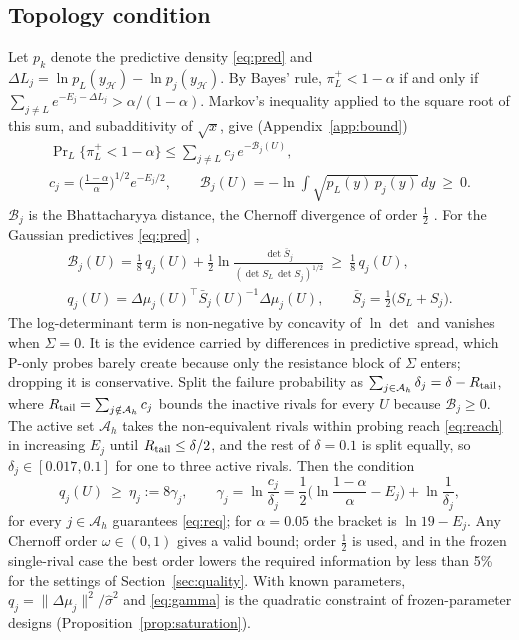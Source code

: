 \documentclass[journal,onecolumn,11pt]{IEEEtran}
\newcommand{\tp}{^{\top}}
\begin{document}
\subsection{Topology condition}
Let $p_k$ denote the predictive density \eqref{eq:pred} and $\Delta L_j=\ln p_L(y_{\mathcal H})-\ln p_j(y_{\mathcal H})$. By Bayes' rule, $\pi_L^+<1-\alpha$ if and only if $\sum_{j\ne L}e^{-E_j-\Delta L_j}>\alpha/(1-\alpha)$. Markov's inequality applied to the square root of this sum, and subadditivity of $\sqrt x$, give (Appendix~\ref{app:bound})
\begin{equation}\label{eq:union}
\begin{gathered}
\Pr\nolimits_L\{\pi_L^+<1-\alpha\}\le\sum_{j\ne L}c_j\,e^{-\mathcal B_j(U)},\\
c_j=\Big(\frac{1-\alpha}{\alpha}\Big)^{1/2}e^{-E_j/2},\qquad
\mathcal B_j(U)=-\ln\int\sqrt{p_L(y)\,p_j(y)}\,dy\ \ge\ 0 .
\end{gathered}
\end{equation}
$\mathcal B_j$ is the Bhattacharyya distance, the Chernoff divergence of order $\tfrac12$ \cite{chernoff1952}. For the Gaussian predictives \eqref{eq:pred} \cite{kailath1967},
\begin{equation}\label{eq:chernoff}
\begin{gathered}
\mathcal B_j(U)=\frac18\,q_j(U)+\frac12\ln\frac{\det\bar S_j}{(\det S_L\,\det S_j)^{1/2}}\ \ge\ \frac18\,q_j(U),\\
q_j(U)=\Delta\mu_j(U)\tp\bar S_j(U)^{-1}\Delta\mu_j(U),\qquad \bar S_j=\tfrac12\big(S_L+S_j\big).
\end{gathered}
\end{equation}
The log-determinant term is non-negative by concavity of $\ln\det$ and vanishes when $\Sigma=0$. It is the evidence carried by differences in predictive spread, which P-only probes barely create because only the resistance block of $\Sigma$ enters; dropping it is conservative. Split the failure probability as $\sum_{j\in\mathcal A_h}\delta_j=\delta-R_{\rm tail}$, where $R_{\rm tail}=\sum_{j\notin\mathcal A_h}c_j$ bounds the inactive rivals for every $U$ because $\mathcal B_j\ge0$. The active set $\mathcal A_h$ takes the non-equivalent rivals within probing reach \eqref{eq:reach} in increasing $E_j$ until $R_{\rm tail}\le\delta/2$, and the rest of $\delta=0.1$ is split equally, so $\delta_j\in[0.017,0.1]$ for one to three active rivals. Then the condition
\begin{equation}\label{eq:gamma}
q_j(U)\ \ge\ \eta_j:=8\gamma_j,\qquad
\gamma_j=\ln\frac{c_j}{\delta_j}=\frac12\Big(\ln\frac{1-\alpha}{\alpha}-E_j\Big)+\ln\frac{1}{\delta_j},
\end{equation}
for every $j\in\mathcal A_h$ guarantees \eqref{eq:req}; for $\alpha=0.05$ the bracket is $\ln19-E_j$. Any Chernoff order $\omega\in(0,1)$ gives a valid bound; order $\tfrac12$ is used, and in the frozen single-rival case the best order lowers the required information by less than 5\% for the settings of Section~\ref{sec:quality}. With known parameters, $q_j=\|\Delta\mu_j\|^2/\hat\sigma^2$ and \eqref{eq:gamma} is the quadratic constraint of frozen-parameter designs (Proposition~\ref{prop:saturation}).
\end{document}
